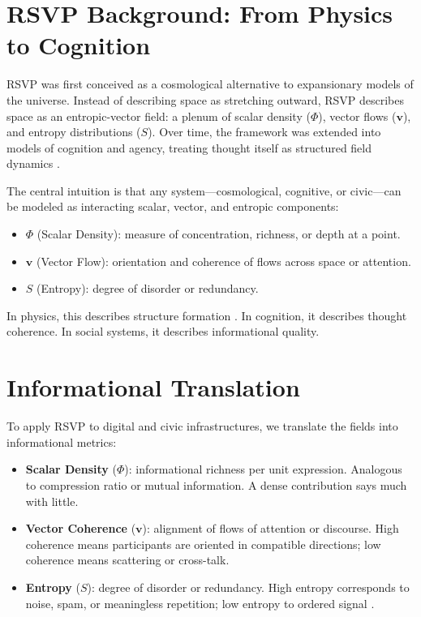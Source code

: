 \documentclass[openany]{book}
\begin{document}
\section{RSVP Background: From Physics to Cognition}

RSVP was first conceived as a cosmological alternative to expansionary models of the universe. Instead of describing space as stretching outward, RSVP describes space as an entropic-vector field: a plenum of scalar density ($\Phi$), vector flows ($\mathbf{v}$), and entropy distributions ($S$). Over time, the framework was extended into models of cognition and agency, treating thought itself as structured field dynamics \cite{barandes2023}.

The central intuition is that any system---cosmological, cognitive, or civic---can be modeled as interacting scalar, vector, and entropic components:

\begin{itemize}
    \item $\Phi$ (Scalar Density): measure of concentration, richness, or depth at a point.
    \item $\mathbf{v}$ (Vector Flow): orientation and coherence of flows across space or attention.
    \item $S$ (Entropy): degree of disorder or redundancy.
\end{itemize}

In physics, this describes structure formation \cite{prigogine1984}. In cognition, it describes thought coherence. In social systems, it describes informational quality.

\section{Informational Translation}

To apply RSVP to digital and civic infrastructures, we translate the fields into informational metrics:

\begin{itemize}
    \item \textbf{Scalar Density} ($\Phi$): informational richness per unit expression. Analogous to compression ratio or mutual information. A dense contribution says much with little.
    \item \textbf{Vector Coherence} ($\mathbf{v}$): alignment of flows of attention or discourse. High coherence means participants are oriented in compatible directions; low coherence means scattering or cross-talk.
    \item \textbf{Entropy} ($S$): degree of disorder or redundancy. High entropy corresponds to noise, spam, or meaningless repetition; low entropy to ordered signal \cite{shannon1948}.
\end{itemize}
\end{document}
